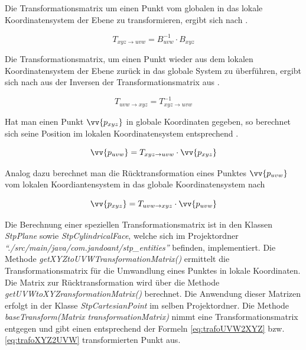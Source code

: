 Die Transformationsmatrix um einen Punkt vom globalen in das lokale Koordinatensystem der Ebene zu transformieren, ergibt sich nach .

\begin{equation}\label{eq:matrixXYZ2UVW}
T_{xyz \rightarrow uvw} = B_{uvw}^{-1} \cdot B_{xyz}  
\end{equation}   

Die Transformationsmatrix, um einen Punkt wieder aus dem lokalen Koordinatensystem der Ebene zurück in das globale System zu überführen, ergibt sich nach  aus der Inversen der Transformationsmatrix aus .

\begin{equation}\label{eq:trafoUVW2XYZ}
T_{uvw \rightarrow xyz} = T_{xyz \rightarrow uvw}^{-1} 
\end{equation}   

Hat man einen Punkt $\vv{p_{xyz}}$ in globale Koordinaten gegeben, so berechnet sich seine Position im lokalen Koordinatensystem entsprechend . 

\begin{equation}\label{eq:trafoxyz2uvw}
\vv{p_{uvw}}=T_{xyz \rightarrow uvw} \cdot \vv{p_{xyz}}
\end{equation}

Analog dazu berechnet man die Rücktransformation eines Punktes $\vv{p_{uvw}}$ vom lokalen Koordiantensystem in das globale Koordinatensystem nach 
  
\begin{equation}\label{eq:trafoUVW2XYZ}
\vv{p_{xyz}}=T_{uvw \rightarrow xyz} \cdot \vv{p_{uvw}}
\end{equation}

Die Berechnung einer speziellen Transformationsmatrix ist in den Klassen \textit{StpPlane} sowie \textit{StpCylindricalFace}, welche sich im Projektordner \textit{"`./src/main/java/com.jandoant/stp\_entities"'} befinden, implementiert. Die Methode \textit{getXYZtoUVWTransformationMatrix()} ermittelt die Transformationsmatrix für die Umwandlung eines Punktes in lokale Koordinaten. Die Matrix zur Rücktransformation wird über die Methode \textit{getUVWtoXYZransformationMatrix()} berechnet. 
Die Anwendung dieser Matrizen erfolgt in der Klasse \textit{StpCartesianPoint} im selben Projektordner. Die Methode \textit{baseTransform(Matrix transformationMatrix)} nimmt eine Transformationsmatrix entgegen und gibt einen entsprechend der Formeln \ref{eq:trafoUVW2XYZ} bzw. \ref{eq:trafoXYZ2UVW} transformierten Punkt aus. 

